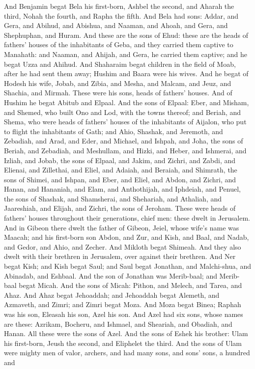 And Benjamin begat Bela his first-born, Ashbel the second, and Aharah the third, Nohah the fourth, and Rapha the fifth. And Bela had sons: Addar, and Gera, and Abihud, and Abishua, and Naaman, and Ahoah, and Gera, and Shephuphan, and Huram. And these are the sons of Ehud: these are the heads of fathers’ houses of the inhabitants of Geba, and they carried them captive to Manahath: and Naaman, and Ahijah, and Gera, he carried them captive; and he begat Uzza and Ahihud. And Shaharaim begat children in the field of Moab, after he had sent them away; Hushim and Baara were his wives. And he begat of Hodesh his wife, Jobab, and Zibia, and Mesha, and Malcam, and Jeuz, and Shachia, and Mirmah. These were his sons, heads of fathers’ houses. And of Hushim he begat Abitub and Elpaal. And the sons of Elpaal: Eber, and Misham, and Shemed, who built Ono and Lod, with the towns thereof; and Beriah, and Shema, who were heads of fathers’ houses of the inhabitants of Aijalon, who put to flight the inhabitants of Gath; and Ahio, Shashak, and Jeremoth, and Zebadiah, and Arad, and Eder, and Michael, and Ishpah, and Joha, the sons of Beriah, and Zebadiah, and Meshullam, and Hizki, and Heber, and Ishmerai, and Izliah, and Jobab, the sons of Elpaal, and Jakim, and Zichri, and Zabdi, and Elienai, and Zillethai, and Eliel, and Adaiah, and Beraiah, and Shimrath, the sons of Shimei, and Ishpan, and Eber, and Eliel, and Abdon, and Zichri, and Hanan, and Hananiah, and Elam, and Anthothijah, and Iphdeiah, and Penuel, the sons of Shashak, and Shamsherai, and Shehariah, and Athaliah, and Jaareshiah, and Elijah, and Zichri, the sons of Jeroham. These were heads of fathers’ houses throughout their generations, chief men: these dwelt in Jerusalem.  And in Gibeon there dwelt the father of Gibeon, Jeiel, whose wife’s name was Maacah; and his first-born son Abdon, and Zur, and Kish, and Baal, and Nadab, and Gedor, and Ahio, and Zecher. And Mikloth begat Shimeah. And they also dwelt with their brethren in Jerusalem, over against their brethren. And Ner begat Kish; and Kish begat Saul; and Saul begat Jonathan, and Malchi-shua, and Abinadab, and Eshbaal. And the son of Jonathan was Merib-baal; and Merib-baal begat Micah. And the sons of Micah: Pithon, and Melech, and Tarea, and Ahaz. And Ahaz begat Jehoaddah; and Jehoaddah begat Alemeth, and Azmaveth, and Zimri; and Zimri begat Moza. And Moza begat Binea; Raphah was his son, Eleasah his son, Azel his son. And Azel had six sons, whose names are these: Azrikam, Bocheru, and Ishmael, and Sheariah, and Obadiah, and Hanan. All these were the sons of Azel. And the sons of Eshek his brother: Ulam his first-born, Jeush the second, and Eliphelet the third. And the sons of Ulam were mighty men of valor, archers, and had many sons, and sons’ sons, a hundred and 